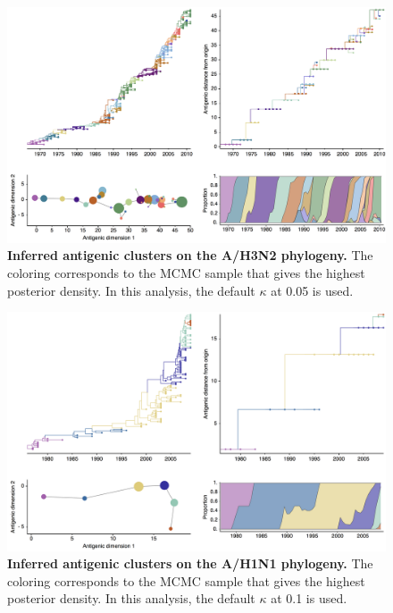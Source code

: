 \documentclass[11pt,oneside,letterpaper]{article}
\begin{document}
\begin{figure}[h]
	\centering		
	\includegraphics[width=1\textwidth]{figures/custom/h3n2_dynamics}
	\caption{\textbf{Inferred antigenic clusters on the A/H3N2 phylogeny.}
 The coloring corresponds to the MCMC sample that gives the highest posterior density.
 In this analysis, the default $\kappa$  at 0.05 is used.
	 		} 
	\label{H3N2tree} 
\end{figure}


\begin{figure}[h]
	\centering		
	\includegraphics[width=1\textwidth]{figures/custom/h1n1_dynamics}
	\caption{\textbf{Inferred antigenic clusters on the A/H1N1 phylogeny.}
 The coloring corresponds to the MCMC sample that gives the highest posterior density. 
 In this analysis, the default $\kappa$  at 0.1 is used.
	 		} 
	\label{H1N1tree} 
\end{figure}
\end{document}

